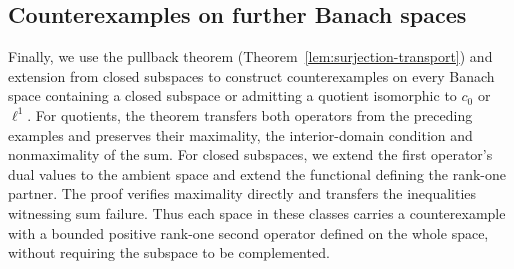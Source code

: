 \documentclass[11pt]{article}
\theoremstyle{definition}
\theoremstyle{remark}
\begin{document}
\subsection{Counterexamples on further Banach spaces}
\label{subsec:further-space-families}
Finally, we use the pullback theorem (Theorem~\ref{lem:surjection-transport}) and extension from closed subspaces to construct counterexamples on every Banach space containing a closed subspace or admitting a quotient isomorphic to $c_0$ or $\ell^1$. For quotients, the theorem transfers both operators from the preceding examples and preserves their maximality, the interior-domain condition and nonmaximality of the sum. For closed subspaces, we extend the first operator's dual values to the ambient space and extend the functional defining the rank-one partner. The proof verifies maximality directly and transfers the inequalities witnessing sum failure. Thus each space in these classes carries a counterexample with a bounded positive rank-one second operator defined on the whole space, without requiring the subspace to be complemented.
\end{document}
